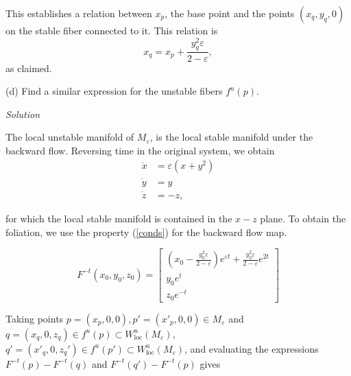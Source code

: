 \documentclass[a4paper,11pt,pdftex]{article}
\begin{document}
This establishes a relation between $x_p$, the base point and the points $(x_q,y_q,0)$ on the stable fiber connected to it. This relation is
$$
x_q = x_p + \frac{y_q^2\varepsilon}{2-\varepsilon},
$$
as claimed.

(d) Find a similar expression for the unstable fibers $f^u(p)$.

\emph{Solution}

The local unstable manifold of $M_\varepsilon$, is the local stable manifold under the backward flow. Reversing time in the original system, we obtain 
\begin{align*}
     \dot{x} &= \varepsilon(x + y^2) \\
    \dot{y} &= y \\
    \dot{z} &= -z,
\end{align*}

for which the local stable manifold is contained in the $x-z$ plane. To obtain the foliation, we use the property (\ref{conds}) for the backward flow map.

\begin{equation*}
\label{eqflowmap2}
F^{-t}(x_0,y_0,z_0) = \begin{bmatrix}
\left(x_0 - \frac{y_0^2 \varepsilon }{2-\varepsilon}\right)e^{\varepsilon t} + \frac{y_0^2\varepsilon}{2-\varepsilon}e^{2t} \\
y_0e^{t} \\
z_0e^{-t}
\end{bmatrix} 
\end{equation*}

Taking points $p = (x_p, 0, 0), p' = (x'_p, 0, 0)\in M_\varepsilon $ and $q = (x_q, 0, z_q) \in f^u(p)\subset W^u_{\text{loc}}(M_\varepsilon)$, $q' = (x'_q, 0, z_q')\in f^u(p')\subset W^u_{\text{loc}}(M_\varepsilon)$, and evaluating the expressions $F^{-t}(p)-F^{-t}(q)$ and $F^{-t}(q')-F^{-t}(p)$ gives
\end{document}
